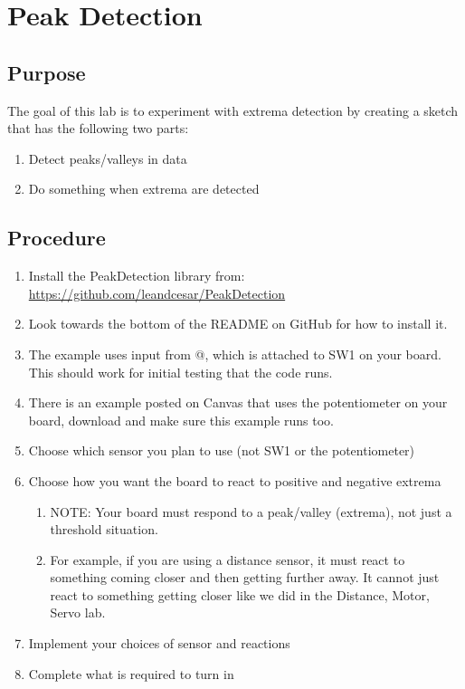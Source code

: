 \chapter{Peak Detection}



\section{Purpose}
The goal of this lab is to experiment with extrema detection by creating a sketch
that has the following two parts:
\begin{enumerate}
    \item Detect peaks/valleys in data 
    \item Do something when extrema are detected
\end{enumerate}



\section{Procedure}

\begin{enumerate}
    \item Install the PeakDetection library from:\\
          \href{https://github.com/leandcesar/PeakDetection}{https://github.com/leandcesar/PeakDetection}
    \item Look towards the bottom of the README on GitHub for how to install it.
    \item The example uses input from @, which is attached to SW1 on your board. 
            This should work for initial testing that the code runs.
    \item There is an example posted on Canvas that uses the potentiometer on your board, download
            and make sure this example runs too.
    \item Choose which sensor you plan to use (not SW1 or the potentiometer)
    \item Choose how you want the board to react to positive and negative extrema 
    \begin{enumerate}
        \item NOTE: Your board must respond to a peak/valley (extrema), not just a threshold situation.
        \item For example, if you are using a distance sensor, it must react to something
                coming closer and then getting further away. It cannot just react to something 
                getting closer like we did in the Distance, Motor, Servo lab.
    \end{enumerate}
    \item Implement your choices of sensor and reactions
    \item Complete what is required to turn in
\end{enumerate}

